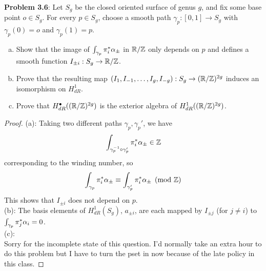 \documentclass{amsart}
\begin{document}
	\textbf{Problem 3.6}: Let $S_g$ be the closed oriented surface of genus $g$, and fix some base point $o\in S_g$. For every  $p\in S_g$, choose a smooth path $\gamma_p:[0,1]\to S_g$ with $\gamma_p(0)=o$ and $\gamma_p(1)=p$.
	\begin{enumerate}[(a)]
		\item Show that the image of $\int_{\gamma_p}\pi_i^*\alpha_{\pm}$ in $\mathbb{R}/\mathbb{Z}$ only depends on $p$ and defines a smooth function $I_{\pm i}:S_g\to \mathbb{R}/\mathbb{Z}$.
		\item Prove that the resulting map $(I_1,I_{-1},\dots,I_g,I_{-g}):S_g\to (\mathbb{R}/\mathbb{Z})^{2g}$ induces an isomorphism on $H^1_{dR}$.
		\item Prove that $H_{dR}^{\bullet}((\mathbb{R}/\mathbb{Z})^{2g})$ is the exterior algebra of $H^1_{dR}((\mathbb{R}/\mathbb{Z})^{2g})$. 
	\end{enumerate}
	\begin{proof}
		(a): Taking two different paths $\gamma_p,\gamma_p'$, we have
		$$
		\int_{\gamma_p^{-1}\circ \gamma_p'} \pi_i^*\alpha_{\pm} \in \mathbb{Z}
		$$
		corresponding to the winding number, so
		$$
		\int_{\gamma_p} \pi_i^*\alpha_{\pm} \equiv \int_{\gamma_p'} \pi_i^*\alpha_{\pm} \pmod {\mathbb{Z}}
		$$
		This shows that $I_{\pm i}$ does not depend on $p$.\\
		
		(b): The basis elements of $H^1_{dR}(S_g)$, $a_{\pm i}$, are each mapped by $I_{\pm j}$ (for $j\neq i$) to $\int_{\gamma_p} \pi_j^* \alpha_i = 0$.\\
		
		(c): \\
		
		Sorry for the incomplete state of this question. I'd normally take an extra hour to do this problem but I have to turn the pset in now because of the late policy in this class.
	\end{proof}
	
\end{document}
